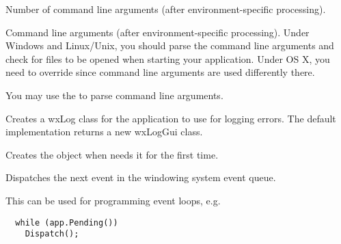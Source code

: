 \label{wxappargc}


Number of command line arguments (after environment-specific processing).


\label{wxappargv}


Command line arguments (after environment-specific processing).
Under Windows and Linux/Unix, you should parse the command line
arguments and check for files to be opened when starting your
application. Under OS X, you need to override 
since command line arguments are used differently there.

You may use the  to
parse command line arguments.

\label{wxappcreatelogtarget}


Creates a wxLog class for the application to use for logging errors. The default
implementation returns a new wxLogGui class.




\label{wxappcreatetraits}


Creates the  object when 
needs it for the first time.




\label{wxappdispatch}


Dispatches the next event in the windowing system event queue.

This can be used for programming event loops, e.g.

\begin{verbatim}
  while (app.Pending())
    Dispatch();
\end{verbatim}




